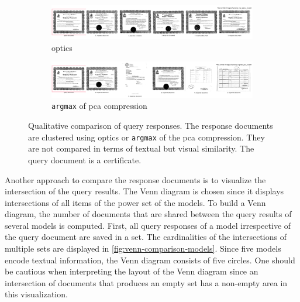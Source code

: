 \begin{figure}[h!]
    \begin{subfigure}{\textwidth}
        \centering
        \includegraphics[width=1\textwidth]{images/query_results/320a70609babe5923c860ad16bc9f48e237b9d275c5269d177befab542bcff50/Most_similar_images_found_by_pca_optics_cluster.pdf}
        \caption{\ac{optics}}
    \end{subfigure}

    \begin{subfigure}{\textwidth}
        \centering
        \includegraphics[width=1\textwidth]{images/query_results/320a70609babe5923c860ad16bc9f48e237b9d275c5269d177befab542bcff50/Most_similar_images_found_by_argmax_pca_cluster.pdf}
        \caption{\texttt{argmax} of \ac{pca} compression}
    \end{subfigure}

\caption[Qualitative comparison of query responses]{Qualitative comparison of query responses.
The response documents are clustered using \ac{optics} or \texttt{argmax} of the \ac{pca} compression.
They are not compared in terms of textual but visual similarity.
The query document is a certificate.
}
\label{fig:comp_vis_query_resp_certificates}
\end{figure}

Another approach to compare the response documents is to visualize the intersection of the query results.
The Venn diagram is chosen since it displays intersections of all items of the power set of the models.
To build a Venn diagram, the number of documents that are shared between the query results of several models is computed.
First, all query responses of a model irrespective of the query document are saved in a set.
The cardinalities of the intersections of multiple sets are displayed in \autoref{fig:venn-comparison-models}.
Since five models encode textual information, the Venn diagram consists of five circles.
One should be cautious when interpreting the layout of the Venn diagram since 
an intersection of documents that produces an empty set has a non-empty area in this visualization.

